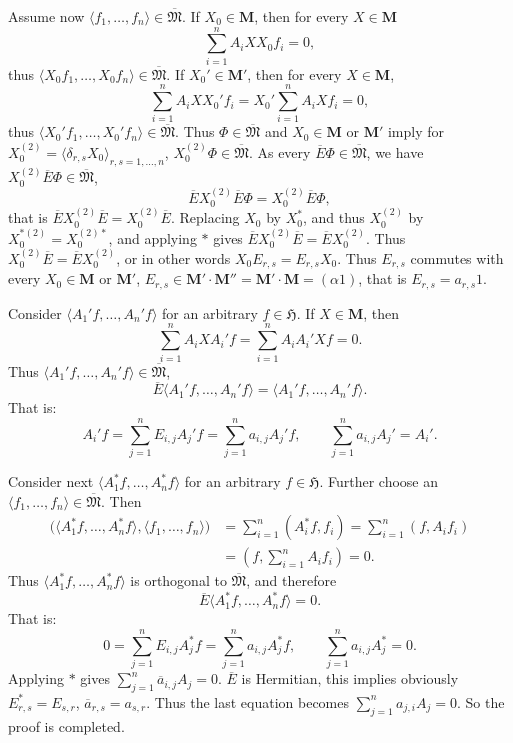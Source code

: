 \documentclass[12pt,b5paper,twoside]{article}
\newcommand{\Hspace}{\mathfrak H}
\newcommand{\M}{\mathbf M}
\begin{document}
Assume now $\langle f_1,\ldots,f_n\rangle\in\overline{\mathfrak M}$. If
$X_0\in\M$, then for every $X\in\M$
\[
 \sum_{i=1}^n A_iXX_0f_i=0,
\]
thus $\langle X_0f_1,\ldots,X_0f_n\rangle\in\overline{\mathfrak M}$. If
$X_0'\in\M'$, then for every $X\in\M$,
\[
 \sum_{i=1}^n A_iXX_0'f_i
 =X_0'\sum_{i=1}^n A_iXf_i=0,
\]
thus $\langle X_0'f_1,\ldots,X_0'f_n\rangle\in\overline{\mathfrak M}$.
Thus $\Phi\in\overline{\mathfrak M}$ and $X_0\in\M$ or $\M'$ imply for
$X_0^{(2)}=\langle\delta_{r,s}X_0\rangle_{r,s=1,\ldots,n}$,
$X_0^{(2)}\Phi\in\overline{\mathfrak M}$. As every
$\overline E\Phi\in\overline{\mathfrak M}$, we have
$X_0^{(2)}\overline E\Phi\in\overline{\mathfrak M}$,
\[
 \overline E X_0^{(2)}\overline E\Phi=X_0^{(2)}\overline E\Phi,
\]
that is $\overline E X_0^{(2)}\overline E=X_0^{(2)}\overline E$.
Replacing $X_0$ by $X_0^*$, and thus $X_0^{(2)}$ by
$X_0^{*(2)}=X_0^{(2)*}$, and applying $*$ gives
$\overline E X_0^{(2)}\overline E=\overline E X_0^{(2)}$. Thus
$X_0^{(2)}\overline E=\overline E X_0^{(2)}$, or in other words
$X_0E_{r,s}=E_{r,s}X_0$. Thus $E_{r,s}$ commutes with every $X_0\in\M$ or
$\M'$, $E_{r,s}\in\M'\cdot\M''=\M'\cdot\M=(\alpha1)$, that is
$E_{r,s}=a_{r,s}1$.

Consider $\langle A_1'f,\ldots,A_n'f\rangle$ for an arbitrary
$f\in\Hspace$. If $X\in\M$, then
\[
 \sum_{i=1}^n A_iXA_i'f
 =\sum_{i=1}^n A_iA_i'Xf=0.
\]
Thus $\langle A_1'f,\ldots,A_n'f\rangle\in\overline{\mathfrak M}$,
\[
 \overline E\langle A_1'f,\ldots,A_n'f\rangle
 =\langle A_1'f,\ldots,A_n'f\rangle.
\]
That is:
\[
 A_i'f=\sum_{j=1}^n E_{i,j}A_j'f
 =\sum_{j=1}^n a_{i,j}A_j'f,
 \qquad
 \sum_{j=1}^n a_{i,j}A_j'=A_i'.
\]

Consider next $\langle A_1^*f,\ldots,A_n^*f\rangle$ for an arbitrary
$f\in\Hspace$. Further choose an
$\langle f_1,\ldots,f_n\rangle\in\overline{\mathfrak M}$. Then
\begin{align*}
 \bigl(\langle A_1^*f,\ldots,A_n^*f\rangle,
       \langle f_1,\ldots,f_n\rangle\bigr)
 &=\sum_{i=1}^n(A_i^*f,f_i)
   =\sum_{i=1}^n(f,A_if_i)\\
 &=\left(f,\sum_{i=1}^n A_if_i\right)=0.
\end{align*}
Thus $\langle A_1^*f,\ldots,A_n^*f\rangle$ is orthogonal to
$\overline{\mathfrak M}$, and therefore
\[
 \overline E\langle A_1^*f,\ldots,A_n^*f\rangle=0.
\]
That is:
\[
 0=\sum_{j=1}^nE_{i,j}A_j^*f
  =\sum_{j=1}^na_{i,j}A_j^*f,
 \qquad
 \sum_{j=1}^na_{i,j}A_j^*=0.
\]
Applying $*$ gives $\sum_{j=1}^n\overline{a}_{i,j}A_j=0$.
$\overline E$ is Hermitian, this implies obviously
$E_{r,s}^*=E_{s,r}$, $\overline a_{r,s}=a_{s,r}$. Thus the last equation
becomes $\sum_{j=1}^n a_{j,i}A_j=0$. So the proof is completed.
\end{document}
